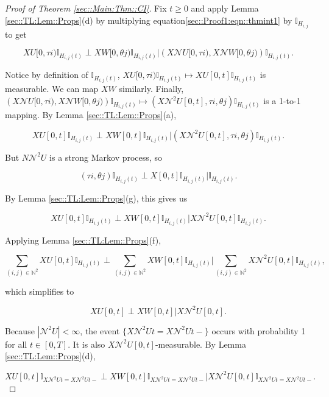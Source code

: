 \documentclass[12pt]{article}
\newcommand{\mb}{\mathbb}
\newcommand{\mc}{\mathcal}
\newcommand{\ind}{\hspace{24pt}}
\renewcommand{\U}{U}							%
\newcommand{\UU}{W}								%
\newcommand{\T}{T}								%
\renewcommand{\t}{t}							%
\newcommand{\X}{X}								%
\newcommand{\neigh}{\mc{N}}						%
\newcommand{\dneigh}{\mc{N}^2}					%
\newcommand{\poiss}{N}							%
\newcommand{\rt}{\tau}							%
\newcommand{\rtt}{\theta}						%
\newcommand{\pathseted}[2]{H_{#1,#2}}			%
\begin{document}
\begin{proof}[Proof of Theorem \ref{sec::Main:Thm::CI}]
\ind Fix \(\t \geq 0\) and apply Lemma \ref{sec::TL:Lem::Props}(d) by multiplying equation\eqref{sec::Proof1:eqn::thmint1} by \(\mb{I}_{\pathseted{i}{j}}\) to get

\[\X{\U}{[0,\rt{i})}\mb{I}_{\pathseted{i}{j}(\t)}\perp\X{\UU}{[0,\rtt{j})}\mb{I}_{\pathseted{i}{j}(\t)}\big|\left(\X{\neigh{\U}}{[0,\rt{i})},\X{\neigh{\UU}}{[0,\rtt{j})}\right)\mb{I}_{\pathseted{i}{j}(\t)}.\]


Notice by definition of \(\mb{I}_{\pathseted{i}{j}(\t)}\), \(\X{\U}{[0,\rt{i})}\mb{I}_{\pathseted{i}{j}(\t)} \mapsto \X{\U}{[0,\t]}\mb{I}_{\pathseted{i}{j}(\t)}\) is measurable. We can map \(\X{\UU}{}\) similarly. Finally, \(\left(\X{\neigh{\U}}{[0,\rt{i})},\X{\neigh{\UU}}{[0,\rtt{j})}\right)\mb{I}_{\pathseted{i}{j}(\t)}\mapsto (\X{\dneigh{\U}}{[0,\t]}, \rt{i},\rtt{j})\mb{I}_{\pathseted{i}{j}(\t)}\) is a 1-to-1 mapping. By Lemma \ref{sec::TL:Lem::Props}(a),

\[\X{\U}{[0,\t]}\mb{I}_{\pathseted{i}{j}(\t)}\perp\X{\UU}{[0,\t]}\mb{I}_{\pathseted{i}{j}(\t)}\big|\left(\X{\dneigh{\U}}{[0,\t]},\rt{i},\rtt{j}\right)\mb{I}_{\pathseted{i}{j}(\t)}.\]

But \(\poiss{\dneigh{\U}}\) is a strong Markov process, so 

\[(\rt{i},\rtt{j})\mb{I}_{\pathseted{i}{j}(\t)}\perp \X{}{[0,\t]}\mb{I}_{\pathseted{i}{j}(\t)}|\mb{I}_{\pathseted{i}{j}(\t)}.\]

By Lemma \ref{sec::TL:Lem::Props}(g), this gives us

\[\X{\U}{[0,\t]}\mb{I}_{\pathseted{i}{j}(\t)}\perp\X{\UU}{[0,\t]}\mb{I}_{\pathseted{i}{j}(\t)}\big|\X{\dneigh{\U}}{[0,\t]}\mb{I}_{\pathseted{i}{j}(\t)}.\]

Applying Lemma \ref{sec::TL:Lem::Props}(f),

\[\sum_{(i,j)\in\mb{N}^2}\X{\U}{[0,\t]}\mb{I}_{\pathseted{i}{j}(\t)}\perp\sum_{(i,j)\in\mb{N}^2}\X{\UU}{[0,\t]}\mb{I}_{\pathseted{i}{j}(\t)}\bigg|\sum_{(i,j)\in\mb{N}^2}\X{\dneigh{\U}}{[0,\t]}\mb{I}_{\pathseted{i}{j}(\t)},\]

which simplifies to 

\[\X{\U}{[0,\t]}\perp\X{\UU}{[0,\t]}\big|\X{\dneigh{\U}}{[0,\t]}.\]

Because \(|\dneigh{\U}| < \infty\), the event \(\{\X{\dneigh{\U}}{\t} = \X{\dneigh{\U}}{\t-}\}\) occurs with probability 1 for all \(\t \in [0,\T]\). It is also \(\X{\dneigh{\U}}{[0,\t]}\)-measurable. By Lemma \ref{sec::TL:Lem::Props}(d),

\[\X{\U}{[0,\t]}\mb{I}_{\X{\dneigh{\U}}{\t} = \X{\dneigh{\U}}{\t-}}\perp\X{\UU}{[0,\t]}\mb{I}_{\X{\dneigh{\U}}{\t} = \X{\dneigh{\U}}{\t-}}\big|\X{\dneigh{\U}}{[0,\t]}\mb{I}_{\X{\dneigh{\U}}{\t} = \X{\dneigh{\U}}{\t-}}.\]


\end{proof}
\end{document}
